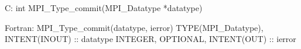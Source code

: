 C:
int MPI_Type_commit(MPI_Datatype *datatype)

Fortran:
MPI_Type_commit(datatype, ierror)
TYPE(MPI_Datatype), INTENT(INOUT) :: datatype
INTEGER, OPTIONAL, INTENT(OUT) :: ierror
